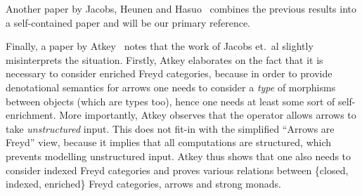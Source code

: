 
Another paper by Jacobs, Heunen and Hasuo~\cite{cat-semantics-arr} combines the
previous results into a self-contained paper and will be our primary reference.

Finally, a paper by Atkey~\cite{atkey-fix} notes that the work of Jacobs et.~al
slightly misinterprets the situation. Firstly, Atkey elaborates on the fact
that it is necessary to consider enriched Freyd categories, because in order to
provide denotational semantics for arrows one needs to consider a \emph{type}
of morphisms between objects (which are types too), hence one needs at least
some sort of self-enrichment. More importantly, Atkey observes that the
\firstArr{} operator allows arrows to take \emph{unstructured} input. This does
not fit-in with the simplified ``Arrows are Freyd'' view, because it implies
that all computations are structured, which prevents modelling unstructured
input. Atkey thus shows that one also needs to consider indexed Freyd categories and
proves various relations between \{closed, indexed, enriched\} Freyd categories,
arrows and strong monads.
